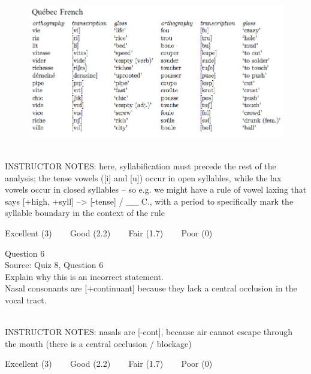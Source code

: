 \documentclass[12pt]{article}
\begin{document}
\begin{figure}[H]
\includegraphics{../images/quebecfrench.png}
\end{figure}

~\\
INSTRUCTOR NOTES: here, syllabification must precede the rest of the analysis; the tense vowels ([i] and [u]) occur in open syllables, while the lax vowels occur in closed syllables -- so e.g. we might have a rule of vowel laxing that says [+high, +syll] --> [-tense] / \_\_ C., with a period to specifically mark the syllable boundary in the context of the rule


\vfill
Excellent (3) ~~~ Good (2.2) ~~~ Fair (1.7) ~~~ Poor (0)
\newpage

{\large Question 6}\\

Source: Quiz 8, Question 6\\

Explain why this is an incorrect statement.\\

Nasal consonants are {[+continuant]} because they lack a central occlusion in the vocal tract.


~\\
INSTRUCTOR NOTES: nasals are [-cont], because air cannot escape through the mouth (there is a central occlusion / blockage)


\vfill
Excellent (3) ~~~ Good (2.2) ~~~ Fair (1.7) ~~~ Poor (0)
\newpage

\begin{center}
\textbf{{\color{red}{\HUGE END OF EXAM}}}\\

\end{center}
\newpage

\begin{center}
\textbf{{\color{blue}{\HUGE START OF EXAM\\}}}

\textbf{{\color{blue}{\HUGE Student ID: empty\\}}}

\textbf{{\color{blue}{\HUGE 4:40 - 5:00 PM\\}}}

\end{center}
\newpage
\end{document}
